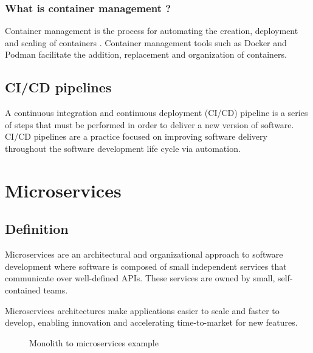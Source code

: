 \subsubsection*{What is container management ?}
Container management is the process for automating the creation, deployment and scaling of containers \cite{container-management}.
Container management tools such as Docker and Podman facilitate the addition, replacement and organization of containers.

\subsection{CI/CD pipelines}
A continuous integration and continuous deployment (CI/CD) pipeline is a series of steps that must be performed in order to deliver a new version of software.
CI/CD pipelines are a practice focused on improving software delivery throughout the software development life cycle via automation. \cite{cicd-definition}

\section{Microservices}

\subsection{Definition}
Microservices are an architectural and organizational approach to software development where software is composed of small independent services that communicate over well-defined APIs.
These services are owned by small, self-contained teams. \cite{microservices}

\medskip
Microservices architectures make applications easier to scale and faster to develop, enabling innovation and accelerating time-to-market for new features.
\begin{figure}[H]
    \centering
    \caption{Monolith to microservices example}
    \label{fig:monolith-to-microservices}
\end{figure}
